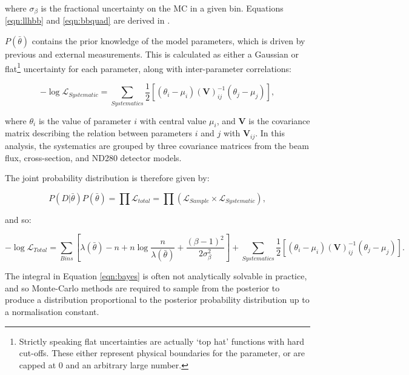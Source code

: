 where $\sigma_{\beta}$ is the fractional uncertainty on the MC in a given bin. Equations \ref{eqn:llhbb} and \ref{eqn:bbquad} are derived in \cite{beestonbarlow}.

$P(\bar{\theta})$ contains the prior knowledge of the model parameters, which is driven by previous and external measurements. This is calculated as either a Gaussian or flat\footnote{Strictly speaking flat uncertainties are actually `top hat' functions with hard cut-offs. These either represent physical boundaries for the parameter, or are capped at 0 and an arbitrary large number.} uncertainty for each parameter, along with inter-parameter correlations:

\begin{equation}
-\log\mathcal{L}_{Systematic} = \sum_{Systematics} \frac{1}{2} [(\theta_i - \mu_i) (\textbf{V})_{ij}^{-1} (\theta_j - \mu_j)],
\end{equation}\label{eqn:systllh}

where $\theta_i$ is the value of parameter $i$ with central value $\mu_i$, and $\textbf{V}$ is the covariance matrix describing the relation between parameters $i$ and $j$ with $\textbf{V}_{ij}$. In this analysis, the systematics are grouped by three covariance matrices from the beam flux, cross-section, and ND280 detector models.

The joint probability distribution is therefore given by:

\begin{equation}
P(D|\bar{\theta}) P(\bar{\theta}) = \prod \mathcal{L}_{total} = \prod (\mathcal{L}_{Sample} \times \mathcal{L}_{Systematic}),
\end{equation}

 and so:

\begin{equation}
-\log\mathcal{L}_{Total} = \sum_{Bins}[\lambda(\bar{\theta}) - n + n \log \frac{n}{\lambda(\bar{\theta})}+ \frac{(\beta -1)^2}{2\sigma^{2}_\beta}] + \sum_{Systematics} \frac{1}{2} [(\theta_i - \mu_i) (\textbf{V})_{ij}^{-1} (\theta_j - \mu_j)].
\end{equation}

The integral in Equation \ref{eqn:bayes} is often not analytically solvable in practice, and so Monte-Carlo methods are required to sample from the posterior to produce a distribution proportional to the posterior probability distribution up to a normalisation constant. 

